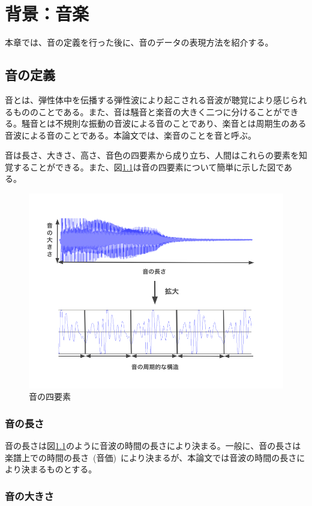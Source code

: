 \chapter{背景：音楽}

本章では、音の定義を行った後に、音のデータの表現方法を紹介する。

\section{音の定義}

音とは、弾性体中を伝播する弾性波により起こされる音波が聴覚により感じられるもののことである。また、音は騒音と楽音の大きく二つに分けることができる。騒音とは不規則な振動の音波による音のことであり、楽音とは周期生のある音波による音のことである。本論文では、楽音のことを音と呼ぶ。

音は長さ、大きさ、高さ、音色の四要素から成り立ち、人間はこれらの要素を知覚することができる。また、図\ref{fig:gakuon}は音の四要素について簡単に示した図である。

\begin{figure}[b]
\begin{center}
\includegraphics[width=0.6\hsize]{figure/gakuon.png}
\caption{音の四要素}
\label{fig:gakuon}
\end{center}
\end{figure}

\subsection{音の長さ}

音の長さは図\ref{fig:gakuon}のように音波の時間の長さにより決まる。一般に、音の長さは楽譜上での時間の長さ~(音価)~により決まるが、本論文では音波の時間の長さにより決まるものとする。

\subsection{音の大きさ}


